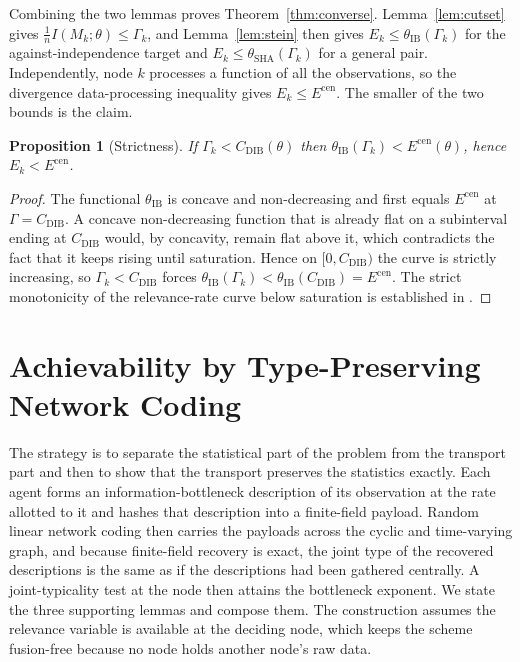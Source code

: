 \documentclass[journal]{IEEEtran}
\newtheorem{proposition}{Proposition}
\theoremstyle{definition}
\theoremstyle{remark}
\newcommand{\Ecen}{E^{\mathrm{cen}}}
\newcommand{\tib}{\theta_{\mathrm{IB}}}
\newcommand{\tsha}{\theta_{\mathrm{SHA}}}
\newcommand{\Gk}{\Gamma_k}
\newcommand{\Cdib}{C_{\mathrm{DIB}}}
\begin{document}
Combining the two lemmas proves Theorem~\ref{thm:converse}. Lemma~\ref{lem:cutset} gives
$\tfrac1n I(M_k;\theta)\le\Gk$, and Lemma~\ref{lem:stein} then gives $E_k\le\tib(\Gk)$ for the against-independence
target and $E_k\le\tsha(\Gk)$ for a general pair. Independently, node $k$ processes a function of all the
observations, so the divergence data-processing inequality gives $E_k\le\Ecen$. The smaller of the two bounds is
the claim.

\begin{proposition}[Strictness]\label{prop:strict}
If $\Gk<\Cdib(\theta)$ then $\tib(\Gk)<\Ecen(\theta)$, hence $E_k<\Ecen$.
\end{proposition}

\begin{proof}
The functional $\tib$ is concave and non-decreasing and first equals $\Ecen$ at $\Gamma=\Cdib$. A concave
non-decreasing function that is already flat on a subinterval ending at $\Cdib$ would, by concavity, remain flat
above it, which contradicts the fact that it keeps rising until saturation. Hence on $[0,\Cdib)$ the curve is
strictly increasing, so $\Gk<\Cdib$ forces $\tib(\Gk)<\tib(\Cdib)=\Ecen$. The strict monotonicity of the
relevance-rate curve below saturation is established in \cite{giladbachrach2003}.
\end{proof}

\section{Achievability by Type-Preserving Network Coding}\label{sec:achieve}
The strategy is to separate the statistical part of the problem from the transport part and then to show that the
transport preserves the statistics exactly. Each agent forms an information-bottleneck description of its
observation at the rate allotted to it and hashes that description into a finite-field payload. Random linear
network coding then carries the payloads across the cyclic and time-varying graph, and because finite-field
recovery is exact, the joint type of the recovered descriptions is the same as if the descriptions had been
gathered centrally. A joint-typicality test at the node then attains the bottleneck exponent. We state the three
supporting lemmas and compose them. The construction assumes the relevance variable is available at the deciding
node, which keeps the scheme fusion-free because no node holds another node's raw data.
\end{document}
